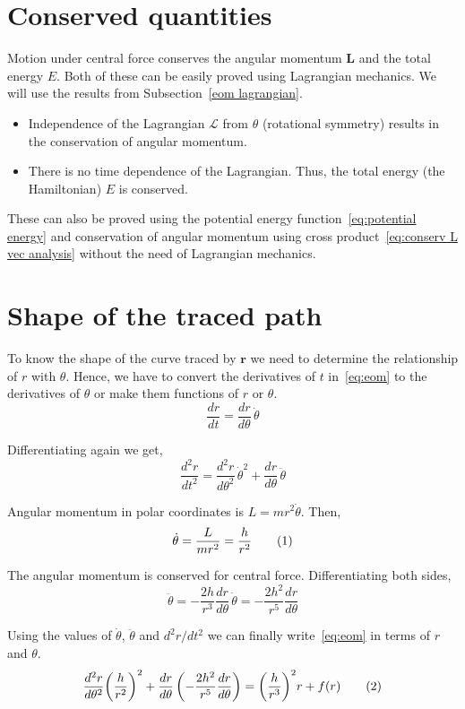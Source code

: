 \documentclass[a4paper, 12pt]{article}
\renewcommand{\indent}{\hspace{3ex}}
\newcommand\labelthis[1]{\addtocounter{equation}{1}\tag{\theequation}\label{#1}}
\renewcommand{\r}{\mathbf{r}}
\renewcommand{\vec}[1]{\mathbf{#1}}
\newcommand{\ddt}[1]{\frac{d#1}{dt}}
\newcommand{\ddtII}[1]{\frac{d^2#1}{dt^2}}
\newcommand{\ddth}[1]{\frac{d#1}{d\theta}}
\newcommand{\ddthII}[1]{\frac{d^2#1}{d\theta^2}}
\newcommand{\Lagr}{\mathcal{L}}
\begin{document}
\section{Conserved quantities}\label{conserved quantities}

\indent Motion under central force conserves the angular momentum $\vec{L}$ and the total energy $E$. Both of these can be easily proved using Lagrangian mechanics. We will use the results from Subsection~\ref{eom lagrangian}.
\begin{itemize}
	\item Independence of the Lagrangian $\Lagr$ from $\theta$ (rotational symmetry) results in the conservation of angular momentum.
	\item There is no time dependence of the Lagrangian. Thus, the total energy (the Hamiltonian) $E$ is conserved.
\end{itemize}

\indent These can also be proved using the potential energy function~\eqref{eq:potential energy} and conservation of angular momentum using cross product~\eqref{eq:conserv L vec analysis} without the need of Lagrangian mechanics.

\section{Shape of the traced path}\label{shape of path}

\indent To know the shape of the curve traced by $\r$ we need to determine the relationship of $r$ with $\theta$. Hence, we have to convert the derivatives of $t$ in~\eqref{eq:eom} to the derivatives of $\theta$ or make them functions of $r$ or $\theta$.
\[ \ddt{r} = \frac{d r}{d\theta} \, \dot{\theta} \]

Differentiating again we get,
\[ \ddtII{r} = \ddthII{r} \, \dot{\theta}^2 + \ddth{r} \, \ddot{\theta} \]

Angular momentum in polar coordinates is $L = m r^2 \dot{\theta}$. Then,
\[ \dot{\theta} = \frac{L}{m r^2} = \frac{h}{r^2} \labelthis{eq:ddttheta} \]

The angular momentum is conserved for central force. Differentiating both sides,
\[ \ddot{\theta} = - \frac{2h}{r^3} \ddth{r} \, \dot{\theta} = - \frac{2h^2}{r^5} \ddth{r} \]

Using the values of $\dot{\theta}$, $\ddot{\theta}$ and $d^2 r/dt^2$ we can finally
write~\eqref{eq:eom} in terms of $r$ and $\theta$.
\[ \ddthII{r} {\left( \frac{h}{r^2} \right)}^2 + \ddth{r} \left( - \frac{2h^2}{r^5} \ddth{r} \right)
= {\left( \frac{h}{r^3} \right)}^2 r + f(r) \labelthis{eq:messy eqn}\]
\end{document}
